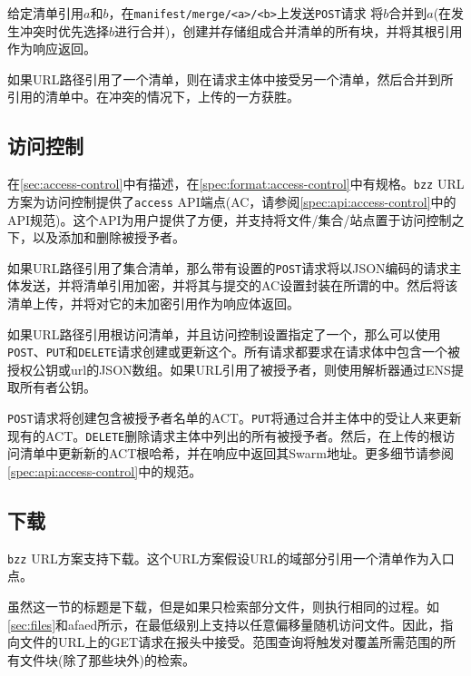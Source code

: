 给定清单引用$a$和$b$，在\lstinline{manifest/merge/<a>/<b>}上发送\lstinline{POST}请求 
将$b$合并到$a$(在发生冲突时优先选择$b$进行合并)，创建并存储组成合并清单的所有块，并将其根引用作为响应返回。


如果URL路径引用了一个清单，则在请求主体中接受另一个清单，然后合并到所引用的清单中。在冲突的情况下，上传的一方获胜。 


\subsection{访问控制\statusgreen}\label{sec:access-control-ux}

在\ref{sec:access-control}中有描述，在\ref{spec:format:access-control}中有规格。\lstinline{bzz} URL方案为访问控制提供了\lstinline{access} API端点(AC，请参阅\ref{spec:api:access-control}中的API规范)。这个API为用户提供了方便，并支持将文件/集合/站点置于访问控制之下，以及添加和删除被授予者。

如果URL路径引用了集合清单，那么带有设置的\lstinline{POST}请求将以JSON编码的请求主体发送，并将清单引用加密，并将其与提交的AC设置封装在所谓的中。然后将该清单上传，并将对它的未加密引用作为响应体返回。 

如果URL路径引用根访问清单，并且访问控制设置指定了一个，那么可以使用\lstinline{POST}、\lstinline{PUT}和\lstinline{DELETE}请求创建或更新这个。所有请求都要求在请求体中包含一个被授权公钥或url的JSON数组。如果URL引用了被授予者，则使用解析器通过ENS提取所有者公钥。

\lstinline{POST}请求将创建包含被授予者名单的ACT。\lstinline{PUT}将通过合并主体中的受让人来更新现有的ACT。\lstinline{DELETE}删除请求主体中列出的所有被授予者。然后，在上传的根访问清单中更新新的ACT根哈希，并在响应中返回其Swarm地址。更多细节请参阅\ref{spec:api:access-control}中的规范。



\subsection{下载\statusgreen}\label{sec:download}

\lstinline{bzz} URL方案支持下载。这个URL方案假设URL的域部分引用一个清单作为入口点。 

虽然这一节的标题是下载，但是如果只检索部分文件，则执行相同的过程。如\ref{sec:files}和afaed所示，在最低级别上支持以任意偏移量随机访问文件。因此，指向文件的URL上的GET请求在报头中接受。范围查询将触发对覆盖所需范围的所有文件块(除了那些块外)的检索。  


